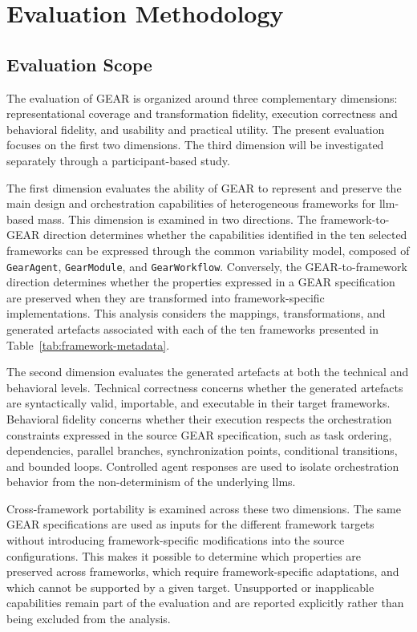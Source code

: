 \section{Evaluation Methodology}
\label{sec:evaluation-methodology}

\subsection{Evaluation Scope}
\label{subsec:evaluation-scope}

The evaluation of GEAR is organized around three complementary dimensions:
representational coverage and transformation fidelity, execution correctness and
behavioral fidelity, and usability and practical utility. The present evaluation
focuses on the first two dimensions. The third dimension will be investigated
separately through a participant-based study.

The first dimension evaluates the ability of GEAR to represent and preserve the
main design and orchestration capabilities of heterogeneous frameworks for
\gls{llm}-based \gls{mas}s. This dimension is examined in two directions. The
framework-to-GEAR direction determines whether the capabilities identified in the
ten selected frameworks can be expressed through the common variability model,
composed of \texttt{GearAgent}, \texttt{GearModule}, and
\texttt{GearWorkflow}. Conversely, the GEAR-to-framework direction determines
whether the properties expressed in a GEAR specification are preserved when they
are transformed into framework-specific implementations. This analysis considers
the mappings, transformations, and generated artefacts associated with each of the
ten frameworks presented in Table~\ref{tab:framework-metadata}.

The second dimension evaluates the generated artefacts at both the technical and
behavioral levels. Technical correctness concerns whether the generated artefacts
are syntactically valid, importable, and executable in their target frameworks.
Behavioral fidelity concerns whether their execution respects the orchestration
constraints expressed in the source GEAR specification, such as task ordering,
dependencies, parallel branches, synchronization points, conditional transitions,
and bounded loops. Controlled agent responses are used to isolate orchestration
behavior from the non-determinism of the underlying \gls{llm}s.

Cross-framework portability is examined across these two dimensions. The same
GEAR specifications are used as inputs for the different framework targets without
introducing framework-specific modifications into the source configurations. This
makes it possible to determine which properties are preserved across frameworks,
which require framework-specific adaptations, and which cannot be supported by a
given target. Unsupported or inapplicable capabilities remain part of the
evaluation and are reported explicitly rather than being excluded from the
analysis.

